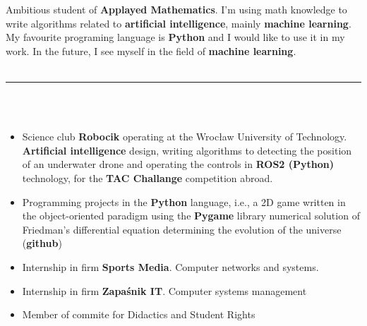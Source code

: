 \documentclass[10pt]{article}
\begin{document}
    \begin{minipage}[t]{0.60\textwidth}
        \newline

        \fontsize{10pt}{10pt}
        Ambitious student of \textbf{Applayed Mathematics}. I'm using math 
         knowledge 
        to write algorithms related to \textbf{artificial intelligence},
        mainly \textbf{machine learning}.
        My favourite programing language is \textbf{Python} and I would like to use it in my work. In the future, I see myself in the field of \textbf{machine learning}. \\ \\
        \rule{11cm}{1pt} \\ \\
        \fontsize{10pt}{10pt}
        \begin{itemize}[leftmargin=*]
            \setlength{\parskip}{0pt}
            \item Science club \textbf{Robocik} operating at the Wrocław University of Technology.
            \textbf{Artificial intelligence} design, writing algorithms to
            detecting the position of an underwater drone and operating the controls in
            \textbf{ROS2 (Python)} technology, for the \textbf{TAC Challange} competition abroad.
            \item Programming projects in the \textbf{Python} language, i.e., a 2D game written
            in the object-oriented paradigm using the \textbf{Pygame} library
            numerical solution of Friedman's differential equation
            determining the evolution of the universe (\textbf{github})
            \item Internship in firm \textbf{Sports Media}. Computer networks and systems.
            \item Internship in firm \textbf{Zapaśnik IT}. Computer systems management
            \item Member of commite for Didactics and Student Rights
        \end{itemize}

\end{minipage}
\end{document}
